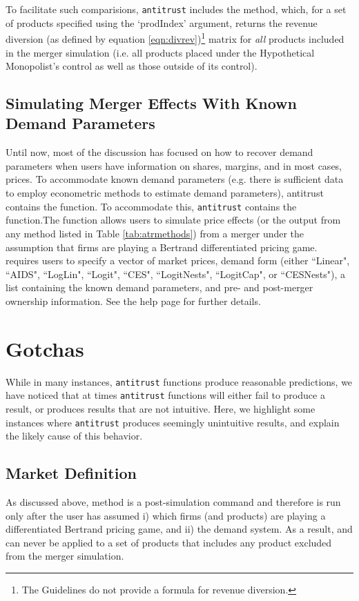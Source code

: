 \documentclass[11pt,numbers=noenddot,pointlessnumbers]{scrreprt}
\newcommand{\atr}{{\tt antitrust}}
\numberwithin{equation}{section}
\begin{document}
To facilitate such comparisions, \atr{} includes the \verb@diversionHypoMon@
method, which, for a set of products specified using the `prodIndex'
argument, returns the revenue diversion (as defined by equation
\ref{eqn:divrev})\footnote{The Guidelines do not provide a
  formula for revenue diversion.} matrix for \emph{all} products
included in the merger simulation (i.e. all products placed under the
Hypothetical Monopolist's control as well as those outside of its
control).

\subsection{Simulating Merger Effects With Known Demand Parameters}
Until now, most of the discussion has focused on how to recover demand
parameters when users have information on shares, margins, and in
most cases, prices. To accommodate known demand parameters (e.g. there
is sufficient data to employ econometric methods to estimate demand
parameters), antitrust contains the \verb@sim@ function. To accommodate this,
\atr{} contains the \verb@sim@ function.The \verb@sim@
function allows users to simulate price effects (or the output from
any method listed in Table \ref{tab:atrmethods}) from a merger under the
assumption that firms are playing a Bertrand differentiated pricing
game. \verb@sim@ requires users to specify a vector of market
prices, demand form (either ``Linear", ``AIDS", ``LogLin", ``Logit",
``CES", ``LogitNests", ``LogitCap", or ``CESNests"), a list containing the known
demand parameters, and pre- and post-merger ownership information. See
the \verb@sim@ help page for further details.


\section{Gotchas}
While in many instances, \atr{} functions produce reasonable
predictions, we have noticed that at times \atr{} functions will
either fail to produce a result, or produces results that are not
intuitive. Here, we highlight some instances where \atr{} produces
seemingly unintuitive results, and explain the likely cause of this behavior.

\subsection{Market Definition}
As discussed above, \verb@HypoMon@ method is a post-simulation
command and therefore is run only after the user has
assumed i) which firms (and products) are playing a differentiated
Bertrand pricing game, and ii) the demand system. As a result,
\verb@HypoMon@ and \verb@diversionHypoMon@ can never be applied to a set
of products that includes any product excluded from the merger simulation.
\end{document}
